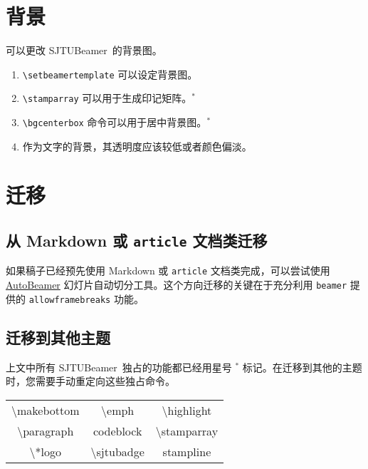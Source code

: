 \documentclass[
    UTF8,
    heading=true,
    12pt,
    a4paper
]{ctexrep}
\def\themename{\textsf{SJTUBeamer}}
\begin{document}
    \chapter{背景}

    可以更改 \themename\ 的背景图。


    \begin{enumerate}\small
        \item \texttt{\textbackslash{}setbeamertemplate} 可以设定背景图。
        \item \texttt{\textbackslash{}stamparray} 可以用于生成印记矩阵。$^*$
        \item \texttt{\textbackslash{}bgcenterbox} 命令可以用于居中背景图。$^*$
        \item 作为文字的背景，其透明度应该较低或者颜色偏淡。
    \end{enumerate}


    \chapter{迁移}

    \section{从 Markdown 或 \texttt{article} 文档类迁移}

    如果稿子已经预先使用 Markdown 或 \texttt{article} 文档类完成，可以尝试使用 \href{https://logcreative.github.io/AutoBeamer/}{AutoBeamer} 幻灯片自动切分工具。这个方向迁移的关键在于充分利用 \texttt{beamer} 提供的 \texttt{allowframebreaks} 功能。

    \section{迁移到其他主题}

    上文中所有 \themename\ 独占的功能都已经用星号 $^*$ 标记。在迁移到其他的主题时，您需要手动重定向这些独占命令。
    
    \begin{table}[h]
        \centering
        \begin{tabular}{>{\ttfamily}c>{\ttfamily}c>{\ttfamily}c}
            \hline
            \textbackslash{}makebottom & \textbackslash{}emph & \textbackslash{}highlight  \\
            \textbackslash{}paragraph & codeblock & \textbackslash{}stamparray \\
            \textbackslash{}*logo & \textbackslash{}sjtubadge & stampline \\
            \hline
        \end{tabular}
    \end{table}
    
\end{document}
